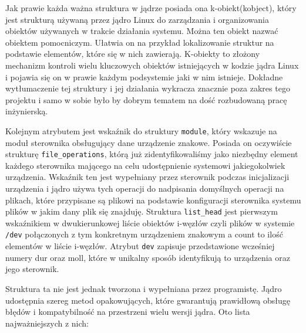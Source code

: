 \documentclass[10pt]{scrartcl}
\begin{document}
Jak prawie każda ważna struktura w jądrze posiada ona k-obiekt(kobject), który jest strukturą używaną przez jądro Linux do zarządzania i organizowania obiektów używanych w trakcie działania systemu. Można ten obiekt nazwać obiektem pomocniczym. Ułatwia on na przykład lokalizowanie struktur na podstawie elementów, które się w nich zawierają. K-obiekty to złożony mechanizm kontroli wielu kluczowych obiektów istniejących w kodzie jądra Linux i pojawia się on w prawie każdym podsystemie jaki w nim istnieje. Dokładne wytłumaczenie tej struktury i jej działania wykracza znacznie poza zakres tego projektu i samo w sobie było by dobrym tematem na dość rozbudowaną pracę inżynierską.

Kolejnym atrybutem jest wskaźnik do struktury \texttt{module}, który wskazuje na moduł sterownika obsługujący dane urządzenie znakowe.  Posiada on oczywiście strukturę \texttt{file\_operations}, którą już zidentyfikowaliśmy jako niezbędny element każdego sterownika mającego na celu udostępnienie systemowi jakiegokolwiek urządzenia. Wskaźnik ten jest wypełniany przez sterownik podczas inicjalizacji urządzenia i jądro używa tych operacji do nadpisania domyślnych operacji na plikach, które przypisane są plikowi na podstawie konfiguracji sterownika systemu plików w jakim dany plik się znajduję. Struktura \texttt{list\_head} jest pierwszym wskaźnikiem w dwukierunkowej liście obiektów i-węzłów czyli plików w systemie \texttt{/dev} połączonych z tym konkretnym urządzeniem znakowym a count to ilość elementów w liście i-węzłów.  Atrybut \texttt{dev} zapisuje przedstawione wcześniej numery dur oraz moll, które w unikalny sposób identyfikują to urządzenia oraz jego sterownik.

Struktura ta nie jest jednak tworzona i wypełniana przez programistę.  Jądro udostępnia szereg metod opakowujących, które gwarantują prawidłową obsługę błędów i kompatybilność na przestrzeni wielu wersji jądra. Oto lista najważniejszych z nich:
\end{document}
